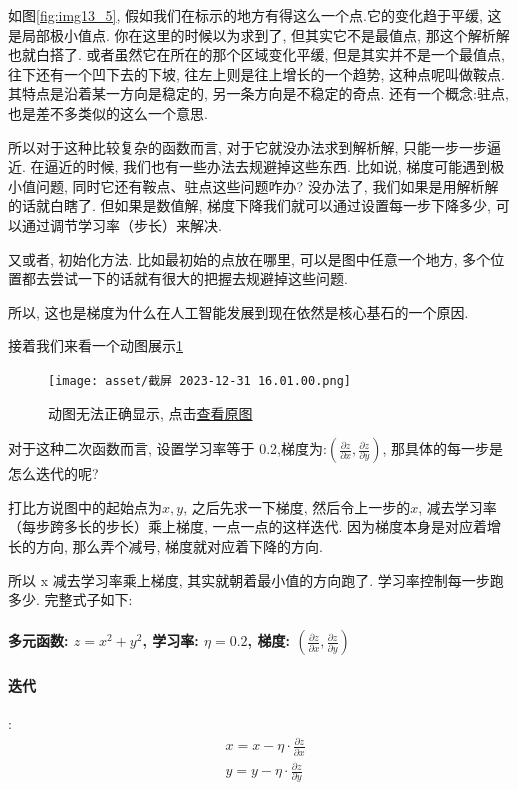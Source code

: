 如图\ref{fig:img13_5}, 假如我们在标示的地方有得这么一个点.它的变化趋于平缓, 这是局部极小值点. 你在这里的时候以为求到了, 但其实它不是最值点, 那这个解析解也就白搭了. 或者虽然它在所在的那个区域变化平缓, 但是其实并不是一个最值点, 往下还有一个凹下去的下坡, 往左上则是往上增长的一个趋势, 这种点呢叫做鞍点. 其特点是沿着某一方向是稳定的, 另一条方向是不稳定的奇点. 还有一个概念:驻点, 也是差不多类似的这么一个意思. 

所以对于这种比较复杂的函数而言, 对于它就没办法求到解析解, 只能一步一步逼近. 在逼近的时候, 我们也有一些办法去规避掉这些东西. 比如说, 梯度可能遇到极小值问题, 同时它还有鞍点、驻点这些问题咋办? 没办法了, 我们如果是用解析解的话就白瞎了. 但如果是数值解, 梯度下降我们就可以通过设置每一步下降多少, 可以通过调节学习率（步长）来解决. 

又或者, 初始化方法. 比如最初始的点放在哪里, 可以是图中任意一个地方, 多个位置都去尝试一下的话就有很大的把握去规避掉这些问题. 

所以, 这也是梯度为什么在人工智能发展到现在依然是核心基石的一个原因. 

接着我们来看一个动图展示\ref{fig:img13_6}

\begin{figure}
  \centering
  \texttt{[image: asset/截屏 2023-12-31 16.01.00.png]}
  \caption{动图无法正确显示, 点击\href{https://raw.githubusercontent.com/hivandu/notes/main/img/20230902191105.gif}{查看原图}}
  \label{fig:img13_6}
\end{figure}

对于这种二次函数而言, 设置学习率等于 0.2,梯度为:$(\frac{\partial z}{\partial x}, \frac{\partial z}{\partial y})$, 那具体的每一步是怎么迭代的呢? 

打比方说图中的起始点为$x, y$, 之后先求一下梯度, 然后令上一步的$x$,  减去学习率（每步跨多长的步长）乘上梯度, 一点一点的这样迭代. 因为梯度本身是对应着增长的方向, 那么弄个减号, 梯度就对应着下降的方向. 

所以 x 减去学习率乘上梯度, 其实就朝着最小值的方向跑了. 学习率控制每一步跑多少. 完整式子如下:

\paragraph{多元函数: $z = x^2 + y ^2$, 学习率: $\eta = 0.2$, 梯度: $(\frac{\partial z}{\partial x}, \frac{\partial z}{\partial y})$}
\paragraph{迭代}:
\begin{align*}
  & x = x - \eta \cdot \frac{\partial z}{\partial x} \\
  & y = y - \eta \cdot \frac {\partial z}{\partial y}
\end{align*}

